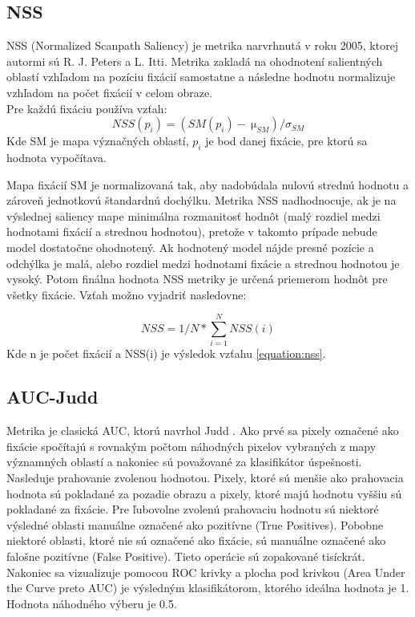 \subsection{NSS}
NSS (Normalized Scanpath Saliency) je metrika narvrhnutá v roku 2005, ktorej autormi sú R. J. Peters a L. Itti.
Metrika zakladá na ohodnotení salientných oblastí vzhľadom na pozíciu fixácií samostatne a následne hodnotu normalizuje vzhľadom na počet fixácií v celom obraze\cite{metrics-1}.
\\
Pre každú fixáciu používa vzťah:
  \begin{equation}
    NSS(p_i) =  (SM(p_i)-\SI{}{\micro}_{SM}) / 	\sigma_{SM}
    \label{equation:nss}
  \end{equation}
Kde SM je mapa význačných oblastí, \begin{math}p_i\end{math} je bod danej fixácie, pre ktorú sa hodnota vypočítava.

Mapa fixácií SM je normalizovaná tak, aby nadobúdala nulovú strednú hodnotu a zároveň jednotkovú štandardnú dochýlku.
Metrika NSS nadhodnocuje, ak je na výslednej saliency mape minimálna rozmanitosť hodnôt (malý rozdiel medzi hodnotami fixácií a strednou hodnotou), pretože v takomto prípade nebude model dostatočne ohodnotený.
Ak hodnotený model nájde presné pozície a odchýlka je malá, alebo rozdiel medzi hodnotami fixácie a strednou hodnotou je vysoký.
Potom finálna hodnota NSS metriky je určená priemerom hodnôt pre všetky fixácie\cite{metrics-1}.
Vzťah možno vyjadriť nasledovne:

\begin{equation}
  NSS = 1/N * \sum_{i=1}^{N}NSS(i)  
\end{equation}
Kde n je počet fixácií a NSS(i) je výsledok vzťahu \ref{equation:nss}.

\subsection{AUC-Judd}
Metrika je clasická AUC, ktorú navrhol Judd \cite{auc-judd}.
Ako prvé sa pixely označené ako fixácie spočítajú s rovnakým počtom náhodných pixelov vybraných z mapy významných oblastí a nakoniec sú považované za klasifikátor úspešnosti.
Nasleduje prahovanie zvolenou hodnotou.
Pixely, ktoré sú menšie ako prahovacia hodnota sú pokladané za pozadie obrazu a pixely, ktoré majú hodnotu vyššiu sú pokladané za fixácie.
Pre ľubovolne zvolenú prahovaciu hodnotu sú niektoré výsledné oblasti manuálne označené ako pozitívne (True Positives).
Pobobne niektoré oblasti, ktoré nie sú označené ako fixácie, sú manuálne označené ako falošne pozitívne (False Positive).
Tieto operácie sú zopakované tisíckrát.
Nakoniec sa vizualizuje pomocou ROC krivky a plocha pod krivkou (Area Under the Curve preto AUC) je výsledným klasifikátorom, ktorého ideálna hodnota je 1.
Hodnota náhodného výberu je 0.5.

